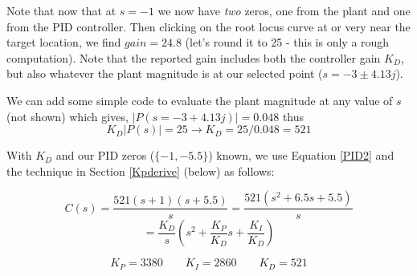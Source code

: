 \begin{ExampleCont}
Note that now that at $s=-1$ we now have {\it two} zeros, one from
the plant and one from the PID controller.   Then clicking on the root locus curve at or
very near the target location, we find $gain = 24.8$  (let's round it to 25 - this is only a rough
computation).  Note that the reported gain includes both the controller gain $K_D$, but also
whatever the plant magnitude is at our selected point ($s=-3\pm4.13j$).

\end{ExampleCont}
\begin{ExampleCont}
We can add some simple code to evaluate the plant magnitude at any value of $s$ (not shown) which
gives, $|P(s=-3+4.13j)|=0.048$ thus
\[
  K_D|P(s)| = 25 \to K_D = 25/0.048 = 521
\]

With $K_D$ and our PID zeros ($\{-1, -5.5\}$) known, we use Equation \ref{PID2}
and the technique in Section \ref{Kpderive} (below) as follows:

\[
C(s) = \frac{521(s+1)(s+5.5)}{s} = \frac {521(s^2+6.5s+5.5)} {s}
\]
\[
= \frac{K_D}{s} \left ( s^2+\frac{K_P}{K_D}s + \frac{K_I}{K_D} \right )
\]

\[
K_P = 3380 \qquad K_I = 2860  \qquad K_D = 521
\]

\end{ExampleCont}

